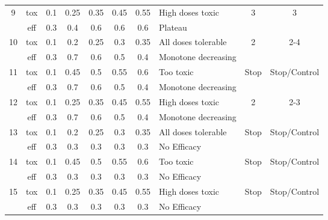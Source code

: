 \begin{table}[h!]
\begin{tabular}{cc|ccccc|l|cc}
		\multirow{2}{*}{9} & tox & 0.1 & 0.25 & 0.35 & 0.45 & 0.55 & High doses toxic & \multirow{2}{*}{3} & \multirow{2}{*}{3} \\
		& eff & 0.3 & 0.4 & 0.6 & 0.6 & 0.6 & Plateau &  &  \\ \hline
		\multirow{2}{*}{10} & tox & 0.1 & 0.2 & 0.25 & 0.3 & 0.35 & All doses tolerable & \multirow{2}{*}{2} & \multirow{2}{*}{2-4} \\
		& eff & 0.3 & 0.7 & 0.6 & 0.5 & 0.4 & Monotone decreasing &  &  \\ \hline
		\multirow{2}{*}{11} & tox & 0.1 & 0.45 & 0.5 & 0.55 & 0.6 & Too toxic & \multirow{2}{*}{Stop} & \multirow{2}{*}{Stop/Control} \\
		& eff & 0.3 & 0.7 & 0.6 & 0.5 & 0.4 & Monotone decreasing &  &  \\ \hline
		\multirow{2}{*}{12} & tox & 0.1 & 0.25 & 0.35 & 0.45 & 0.55 & High doses toxic & \multirow{2}{*}{2} & \multirow{2}{*}{2-3} \\
		& eff & 0.3 & 0.7 & 0.6 & 0.5 & 0.4 & Monotone decreasing &  &  \\ \hline
		\multirow{2}{*}{13} & tox & 0.1 & 0.2 & 0.25 & 0.3 & 0.35 & All doses tolerable & \multirow{2}{*}{Stop} & \multirow{2}{*}{Stop/Control} \\
		& eff & 0.3 & 0.3 & 0.3 & 0.3 & 0.3 & No Efficacy &  &  \\ \hline
		\multirow{2}{*}{14} & tox & 0.1 & 0.45 & 0.5 & 0.55 & 0.6 & Too toxic & \multirow{2}{*}{Stop} & \multirow{2}{*}{Stop/Control} \\
		& eff & 0.3 & 0.3 & 0.3 & 0.3 & 0.3 & No Efficacy &  &  \\ \hline
		\multirow{2}{*}{15} & tox & 0.1 & 0.25 & 0.35 & 0.45 & 0.55 & High doses toxic & \multirow{2}{*}{Stop} & \multirow{2}{*}{Stop/Control} \\
		& eff & 0.3 & 0.3 & 0.3 & 0.3 & 0.3 & No Efficacy &  &  \\ \hline
	\end{tabular}
\end{table}
\newpage

\setlength\LTcapwidth{\textwidth}
\begingroup\fontsize{9}{11}\selectfont

